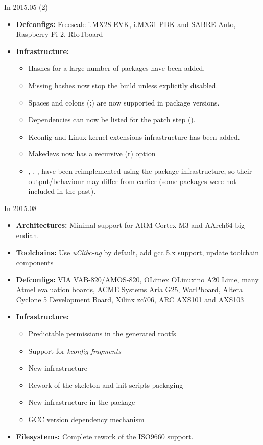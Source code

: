 \begin{frame}{In 2015.05 (2)}
  \begin{itemize}
  \item {\bf Defconfigs:} Freescale i.MX28 EVK, i.MX31 PDK and SABRE
    Auto, Raspberry Pi 2, RIoTboard
  \item {\bf Infrastructure:}
    \begin{itemize}
    \item Hashes for a large number of packages have
      been added.
    \item Missing hashes now stop the build unless
      explicitly disabled.
    \item Spaces and colons (:) are now supported in package versions.
    \item Dependencies can now be listed for the patch step
      ().
    \item Kconfig and Linux kernel extensions infrastructure has
      been added.
    \item Makedevs now has a recursive (r) option
    \item {}, , ,
       have been reimplemented using the package
      infrastructure, so their output/behaviour may differ from
      earlier (some packages were not included in the past).
    \end{itemize}
  \end{itemize}
\end{frame}

\begin{frame}{In 2015.08}
  \begin{itemize}
  \item {\bf Architectures:} Minimal support for ARM Cortex-M3 and
    AArch64 big-endian.
  \item {\bf Toolchains:} Use {\em uClibc-ng} by default, add gcc 5.x
    support, update toolchain components
  \item {\bf Defconfigs:} VIA VAB-820/AMOS-820, OLimex OLinuxino A20
    Lime, many Atmel evaluation boards, ACME Systems Aria G25,
    WarPboard, Altera Cyclone 5 Development Board, Xilinx zc706, ARC
    AXS101 and AXS103
  \item {\bf Infrastructure:}
    \begin{itemize}
    \item Predictable permissions in the generated rootfs
    \item Support for {\em kconfig fragments}
    \item New  infrastructure
    \item Rework of the skeleton and init scripts packaging
    \item New  infrastructure in the 
      package
    \item GCC version dependency mechanism
    \end{itemize}
  \item {\bf Filesystems:} Complete rework of the ISO9660 support.
  \end{itemize}
\end{frame}

